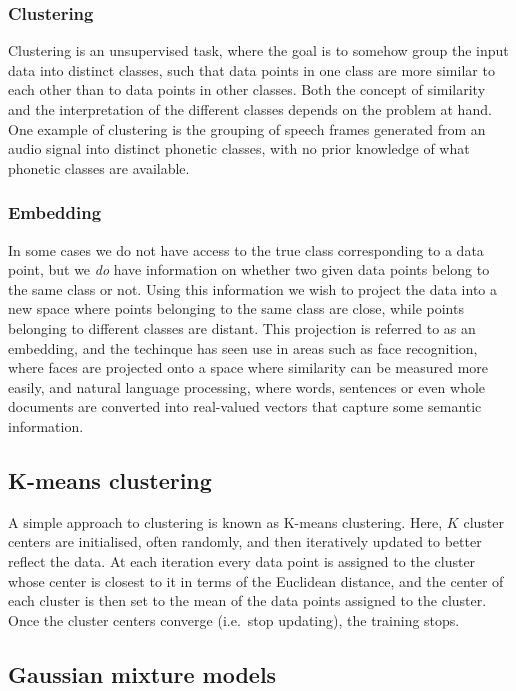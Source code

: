 \subsubsection{Clustering}

Clustering is an unsupervised task, where the goal is to somehow group the input data into distinct classes, such that data points in one class are more similar to each other than to data points in other classes.
Both the concept of similarity and the interpretation of the different classes depends on the problem at hand.
One example of clustering is the grouping of speech frames generated from an audio signal into distinct phonetic classes, with no prior knowledge of what phonetic classes are available.

\subsubsection{Embedding}

In some cases we do not have access to the true class corresponding to a data point, but we \emph{do} have information on whether two given data points belong to the same class or not.
Using this information we wish to project the data into a new space where points belonging to the same class are close, while points belonging to different classes are distant.
This projection is referred to as an embedding, and the techinque has seen use in areas such as face recognition, where faces are projected onto a space where similarity can be measured more easily, and natural language processing, where words, sentences or even whole documents are converted into real-valued vectors that capture some semantic information.

\subsection{K-means clustering}

A simple approach to clustering is known as K-means clustering.
Here, $K$ cluster centers are initialised, often randomly, and then iteratively updated to better reflect the data.
At each iteration every data point is assigned to the cluster whose center is closest to it in terms of the Euclidean distance, and the center of each cluster is then set to the mean of the data points assigned to the cluster.
Once the cluster centers converge (i.e.\ stop updating), the training stops.

\subsection{Gaussian mixture models}

